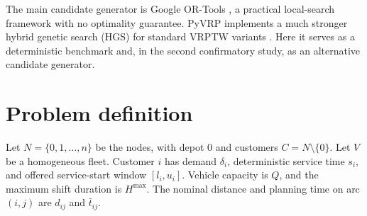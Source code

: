 \documentclass[11pt,a4paper]{article}
\begin{document}
The main candidate generator is Google OR-Tools \cite{ortools}, a practical
local-search framework with no optimality guarantee. PyVRP implements a much
stronger hybrid genetic search (HGS) for standard VRPTW variants
\cite{vidal2022,wouda2024}. Here it serves as a deterministic benchmark and, in
the second confirmatory study, as an alternative candidate generator.

\section{Problem definition}

Let $N=\{0,1,\ldots,n\}$ be the nodes, with depot 0 and customers
$C=N\setminus\{0\}$. Let $V$ be a homogeneous fleet. Customer $i$ has demand
$\delta_i$, deterministic service time $s_i$, and offered service-start window
$[l_i,u_i]$. Vehicle capacity is $Q$, and the maximum shift duration is
$H^{\max}$. The nominal distance and planning time on arc $(i,j)$ are $d_{ij}$
and $\bar t_{ij}$.
\end{document}
